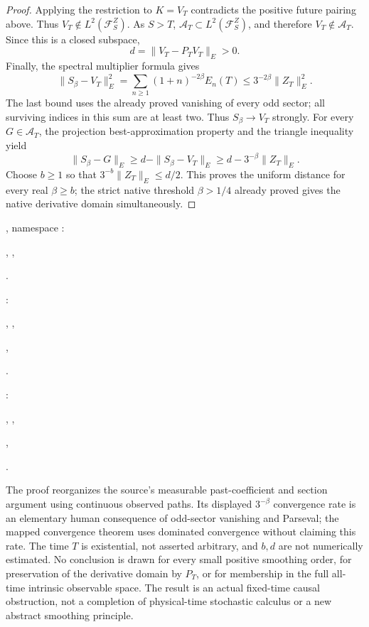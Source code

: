 \documentclass[11pt]{article}
\begin{document}
\begin{proof}
Applying the restriction to $K=V_T$ contradicts the positive future
pairing above. Thus $V_T\notin L^2(\mathcal F_S^Z)$.
As $S>T$, $\mathcal A_T\subset L^2(\mathcal F_S^Z)$, and therefore
$V_T\notin\mathcal A_T$. Since this is a closed subspace,
\[
 d=\|V_T-P_TV_T\|_E>0.
\]
Finally, the spectral multiplier formula gives
\[
 \|S_\beta-V_T\|_E^2
   =\sum_{n\geq1}(1+n)^{-2\beta}E_n(T)
   \leq3^{-2\beta}\|Z_T\|_E^2.
\]
The last bound uses the already proved vanishing of every odd sector;
all surviving indices in this sum are at least two. Thus
$S_\beta\to V_T$ strongly. For every $G\in\mathcal A_T$, the projection
best-approximation property and the triangle inequality yield
\[
 \|S_\beta-G\|_E\geq d-\|S_\beta-V_T\|_E
                  \geq d-3^{-\beta}\|Z_T\|_E.
\]
Choose $b\geq1$ so that $3^{-b}\|Z_T\|_E\leq d/2$.
This proves the uniform distance for every real $\beta\geq b$;
the strict native threshold $\beta>1/4$ already proved gives the native
derivative domain simultaneously.
\end{proof}
\par\noindent{}, namespace :
\par\noindent{}, ,
\par\noindent{}.
\par\noindent{}:
\par\noindent{}, ,
\par\noindent{},
\par\noindent{}.
\par\noindent{}:
\par\noindent{}, ,
\par\noindent{},
\par\noindent{}.

The proof reorganizes the source's measurable past-coefficient and
section argument using continuous observed paths. Its displayed
$3^{-\beta}$ convergence rate is an elementary human consequence of
odd-sector vanishing and Parseval; the mapped convergence theorem uses
dominated convergence without claiming this rate. The time $T$ is
existential, not asserted arbitrary, and $b,d$ are not numerically
estimated. No conclusion is drawn for every small positive smoothing
order, for preservation of the derivative domain by $P_T$, or for
membership in the full all-time intrinsic observable space. The result
is an actual fixed-time causal obstruction, not a completion of
physical-time stochastic calculus or a new abstract smoothing principle.
\end{document}
